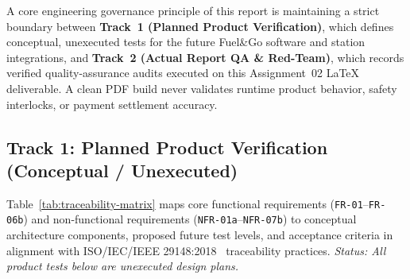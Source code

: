 
A core engineering governance principle of this report is maintaining a strict boundary between \textbf{Track~1 (Planned Product Verification)}, which defines conceptual, unexecuted tests for the future Fuel\&Go software and station integrations, and \textbf{Track~2 (Actual Report QA \& Red-Team)}, which records verified quality-assurance audits executed on this Assignment~02 LaTeX deliverable. A clean PDF build never validates runtime product behavior, safety interlocks, or payment settlement accuracy.

\subsection{Track 1: Planned Product Verification (Conceptual / Unexecuted)}
Table~\ref{tab:traceability-matrix} maps core functional requirements (\texttt{FR-01}--\texttt{FR-06b}) and non-functional requirements (\texttt{NFR-01a}--\texttt{NFR-07b}) to conceptual architecture components, proposed future test levels, and acceptance criteria in alignment with ISO/IEC/IEEE 29148:2018~\cite{iso29148_2018} traceability practices. \emph{Status: All product tests below are unexecuted design plans.}

